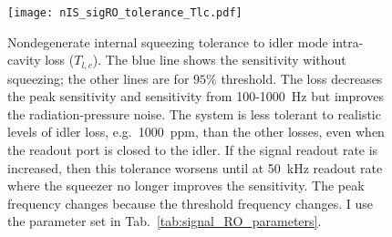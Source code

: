 \begin{figure}
    \centering
    \texttt{[image: nIS\_sigRO\_tolerance\_Tlc.pdf]}
    \caption{Nondegenerate internal squeezing tolerance to idler mode intra-cavity loss ($T_{l,c}$). The blue line shows the sensitivity without squeezing; the other lines are for $95\%$ threshold.
    The loss decreases the peak sensitivity and sensitivity from 100-1000~Hz but improves the radiation-pressure noise. The system is less tolerant to realistic levels of idler loss, e.g.\ 1000~ppm, than the other losses, even when the readout port is closed to the idler. If the signal readout rate is increased, then this tolerance worsens until at 50~kHz readout rate where the squeezer no longer improves the sensitivity. The peak frequency changes because the threshold frequency changes. I use the parameter set in Tab.~\ref{tab:signal_RO_parameters}.}
    \label{fig:nIS_sigRO_tolerance_Tlc}
\end{figure}

